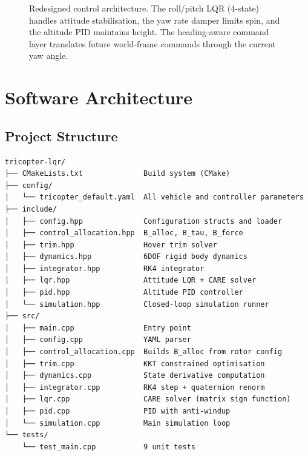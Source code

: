 \documentclass[12pt, a4paper]{article}
\begin{document}
\begin{figure}[H]
\caption{Redesigned control architecture.  The roll/pitch LQR (4-state) handles attitude stabilisation, the yaw rate damper limits spin, and the altitude PID maintains height.  The heading-aware command layer translates future world-frame commands through the current yaw angle.}
\end{figure}

\section{Software Architecture}
\label{sec:software}

\subsection{Project Structure}

\begin{verbatim}
tricopter-lqr/
├── CMakeLists.txt              Build system (CMake)
├── config/
│   └── tricopter_default.yaml  All vehicle and controller parameters
├── include/
│   ├── config.hpp              Configuration structs and loader
│   ├── control_allocation.hpp  B_alloc, B_tau, B_force
│   ├── trim.hpp                Hover trim solver
│   ├── dynamics.hpp            6DOF rigid body dynamics
│   ├── integrator.hpp          RK4 integrator
│   ├── lqr.hpp                 Attitude LQR + CARE solver
│   ├── pid.hpp                 Altitude PID controller
│   └── simulation.hpp          Closed-loop simulation runner
├── src/
│   ├── main.cpp                Entry point
│   ├── config.cpp              YAML parser
│   ├── control_allocation.cpp  Builds B_alloc from rotor config
│   ├── trim.cpp                KKT constrained optimisation
│   ├── dynamics.cpp            State derivative computation
│   ├── integrator.cpp          RK4 step + quaternion renorm
│   ├── lqr.cpp                 CARE solver (matrix sign function)
│   ├── pid.cpp                 PID with anti-windup
│   └── simulation.cpp          Main simulation loop
└── tests/
    └── test_main.cpp           9 unit tests
\end{verbatim}
\end{document}
